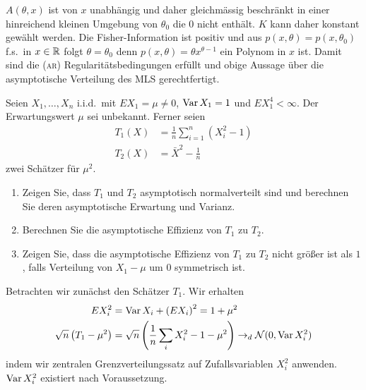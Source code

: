 $A(\theta,x)$ ist von $x$ unabhängig und daher gleichmässig beschränkt in einer
hinreichend kleinen Umgebung von $\theta_0$ die $0$ nicht enthält. $K$ kann daher konstant 
gewählt werden. Die Fisher-Information ist positiv und aus $p(x,\theta)=p(x,\theta_0)$ f.s.\ in
$x\in\mathbb R$ folgt $\theta=\theta_0$ denn $p(x,\theta)= \theta x^{\theta-1}$ ein Polynom in $x$ ist. 
Damit sind die \textsc{(ar)} Regularitätsbedingungen erfüllt und obige Aussage über die
asymptotische Verteilung des MLS gerechtfertigt.








 Seien $X_1,\ldots,X_n$ i.i.d.\ mit $E X_1=\mu\neq 0$,
$\operatorname{Var} X_1 = 1$ und $E X_1^4 < \infty$. Der Erwartungswert $\mu$ sei unbekannt. 
Ferner seien 
\begin{align*}
    T_1(X) &= \frac{1}{n} \sum_{i=1}^{n} \left( X_i^2 -1 \right) \\
    T_2(X) &= {\bar X}^2 - \frac{1}{n}
\end{align*}
zwei Schätzer für $\mu^2$. 
\begin{enumerate}
    \item Zeigen Sie, dass $T_1$ und $T_2$ asymptotisch normalverteilt sind und
        berechnen Sie deren asymptotische Erwartung und Varianz.
    \item Berechnen Sie die asymptotische Effizienz von $T_1$ zu $T_2$.
    \item Zeigen Sie, dass die asymptotische Effizienz von $T_1$ zu $T_2$ nicht
        größer ist als $1$, falls Verteilung von $X_1 -\mu$ um $0$ symmetrisch
        ist.
\end{enumerate}

\solution Betrachten wir zunächst den Schätzer $T_1$. Wir erhalten
\begin{align*}
    E X_i^2 &=  \operatorname{Var} X_i + \left( E X_i \right)^2 = 1 + \mu^2  \\
    \sqrt{n} \left( T_1 - \mu^2 \right) &= 
    \sqrt{n}\left( \frac{1}{n} \sum_{i}^{} X_i^2 -1 -\mu^2 \right) \to_d \mathcal N(0, \operatorname{Var} X_i^2)
\end{align*}
indem wir zentralen Grenzverteilungssatz auf Zufallsvariablen $X_i^2$ anwenden. $\operatorname{Var} X_i^2$ existiert
nach Voraussetzung.

